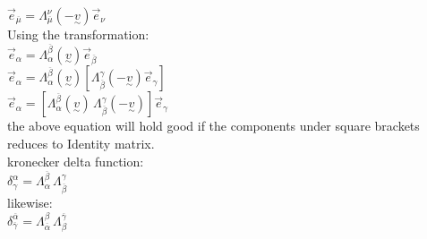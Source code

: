 \documentclass[11pt,a4paper]{article}
\begin{document}
\begin{enumerate}
\begin{enumerate}
                    $\vec{e}_{\overline{\mu}} = \Lambda^{\nu}_{\overline{\mu}}(-\underset{\sim}{v})\vec{e}_{\nu} $\\

                    Using the transformation:\\
                    $\vec{e}_{\alpha} = \Lambda^{\overline{\beta}}_{\alpha}(\underset{\sim}{v})\vec{e}_{\overline{\beta}}$\\
                    $\vec{e}_{\alpha} = \Lambda^{\overline{\beta}}_{\alpha}(\underset{\sim}{v})\left[\Lambda^{\gamma}_{\overline{\beta}}(-\underset{\sim}{v})\vec{e}_{\gamma}\right]$\\
                    $\vec{e}_{\alpha} = \left[\Lambda^{\overline{\beta}}_{\alpha}(\underset{\sim}{v})\, \Lambda^{\gamma}_{\overline{\beta}}(-\underset{\sim}{v})\right]\vec{e}_{\gamma}$\\
                    the above equation will hold good if the components under square brackets reduces to Identity matrix.\\
                    kronecker delta function:\\
                    $\delta^{\alpha}_{\gamma}= \Lambda^{\overline{\beta}}_{\alpha}\, \Lambda^{\gamma}_{\overline{\beta}}$\\
                    likewise:\\
                    $\delta^{\overline\alpha}_{\overline\gamma}= \Lambda^{\beta}_{\overline\alpha}\, \Lambda^{\overline\gamma}_{\beta}$\\


\end{enumerate}
\end{enumerate}
\end{document}
